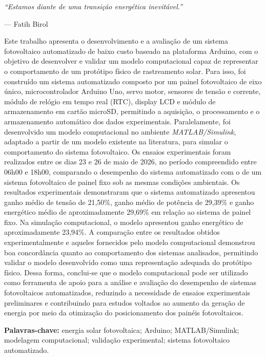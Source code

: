 \documentclass[
	12pt,				%
	twoside,			%
	a4paper,			%
	chapter=TITLE,		%
	section=TITLE,		%
	subsection=TITLE,	%
	subsubsection=TITLE,%
	english,			%
	french,				%
	spanish,			%
	brazilian,			%
	]{abntex2}
\begin{document}
\begin{epigrafe}
    \vspace*{\fill}
    \begin{flushright}
        \textit{“Estamos diante de uma transição energética inevitável.”}

        — Fatih Birol
    \end{flushright}
\end{epigrafe}

\setlength{\absparsep}{18pt} %

\begin{resumo} 
	
	Este trabalho apresenta o desenvolvimento e a avaliação de um sistema fotovoltaico automatizado de baixo custo baseado na plataforma Arduino, com o objetivo de desenvolver e validar um modelo computacional capaz de representar o comportamento de um protótipo físico de rastreamento solar. Para isso, foi construído um sistema automatizado composto por um painel fotovoltaico de eixo único, microcontrolador Arduino Uno, servo motor, sensores de tensão e corrente, módulo de relógio em tempo real (RTC), display LCD e módulo de armazenamento em cartão microSD, permitindo a aquisição, o processamento e o armazenamento automático dos dados experimentais. Paralelamente, foi desenvolvido um modelo computacional no ambiente \textit{MATLAB/Simulink}, adaptado a partir de um modelo existente na literatura, para simular o comportamento do sistema fotovoltaico. Os ensaios experimentais foram realizados entre os dias 23 e 26 de maio de 2026, no período compreendido entre 06h00 e 18h00, comparando o desempenho do sistema automatizado com o de um sistema fotovoltaico de painel fixo sob as mesmas condições ambientais. Os resultados experimentais demonstraram que o sistema automatizado apresentou ganho médio de tensão de 21,50\%, ganho médio de potência de 29,39\% e ganho energético médio de aproximadamente 29,69\% em relação ao sistema de painel fixo. Na simulação computacional, o modelo apresentou ganho energético de aproximadamente 23,94\%. A comparação entre os resultados obtidos experimentalmente e aqueles fornecidos pelo modelo computacional demonstrou boa concordância quanto ao comportamento dos sistemas analisados, permitindo validar o modelo desenvolvido como uma representação adequada do protótipo físico. Dessa forma, conclui-se que o modelo computacional pode ser utilizado como ferramenta de apoio para a análise e avaliação do desempenho de sistemas fotovoltaicos automatizados, reduzindo a necessidade de ensaios experimentais preliminares e contribuindo para estudos voltados ao aumento da geração de energia por meio da otimização do posicionamento dos painéis fotovoltaicos. 
	
\textbf{Palavras-chave:} energia solar fotovoltaica; Arduino; MATLAB/Simulink; modelagem computacional; validação experimental; sistema fotovoltaico automatizado.
\end{resumo}
\end{document}
